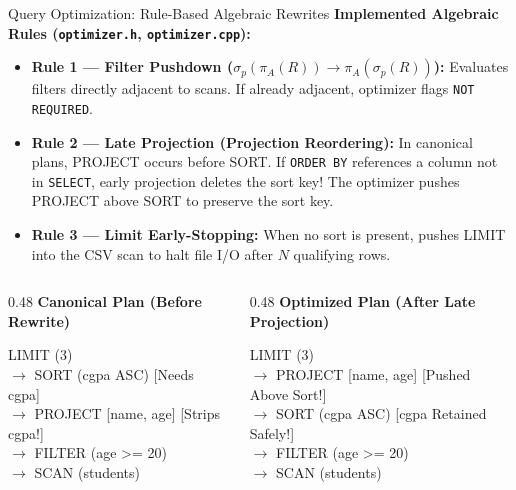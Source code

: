 \documentclass[aspectratio=169,10pt]{beamer}
\begin{document}
\begin{frame}{Query Optimization: Rule-Based Algebraic Rewrites}
    \textbf{Implemented Algebraic Rules (\texttt{optimizer.h}, \texttt{optimizer.cpp}):}
    \begin{itemize}\footnotesize
        \item \textbf{Rule 1 --- Filter Pushdown ($\sigma_p(\pi_A(R)) \to \pi_A(\sigma_p(R))$):} Evaluates filters directly adjacent to scans. If already adjacent, optimizer flags \texttt{NOT REQUIRED}.
        \item \textbf{Rule 2 --- Late Projection (Projection Reordering):} In canonical plans, PROJECT occurs before SORT. If \texttt{ORDER BY} references a column not in \texttt{SELECT}, early projection deletes the sort key! The optimizer pushes PROJECT above SORT to preserve the sort key.
        \item \textbf{Rule 3 --- Limit Early-Stopping:} When no sort is present, pushes LIMIT into the CSV scan to halt file I/O after $N$ qualifying rows.
    \end{itemize}
    \vspace{0.5em}
    \begin{columns}[T]
        \begin{column}{0.48\textwidth}
            \textbf{Canonical Plan (Before Rewrite)}
            \begin{block}{}\footnotesize\ttfamily
                LIMIT (3)\\
                $\to$ SORT (cgpa ASC) [Needs cgpa]\\
                $\to$ PROJECT [name, age] [Strips cgpa!]\\
                $\to$ FILTER (age >= 20)\\
                $\to$ SCAN (students)
            \end{block}
        \end{column}
        \begin{column}{0.48\textwidth}
            \textbf{Optimized Plan (After Late Projection)}
            \begin{block}{}\footnotesize\ttfamily
                LIMIT (3)\\
                $\to$ PROJECT [name, age] [Pushed Above Sort!]\\
                $\to$ SORT (cgpa ASC) [cgpa Retained Safely!]\\
                $\to$ FILTER (age >= 20)\\
                $\to$ SCAN (students)
            \end{block}
        \end{column}
    \end{columns}
\end{frame}
\end{document}
